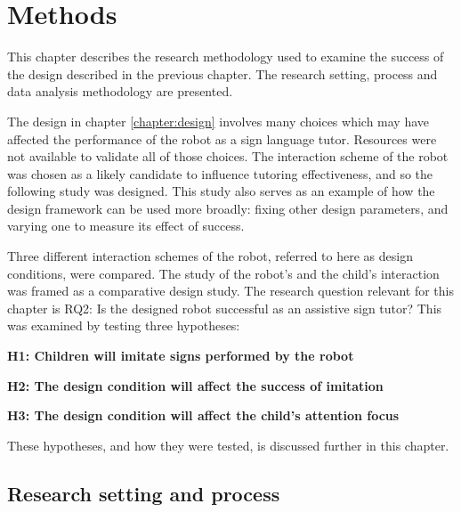 \chapter{Methods}
\label{chapter:methods}

This chapter describes the research methodology used to examine the success of the design described in the previous chapter. The research setting, process and data analysis methodology are presented. 

The design in chapter \ref{chapter:design} involves many choices which may have affected the performance of the robot as a sign language tutor. Resources were not available to validate all of those choices. The interaction scheme of the robot was chosen as a likely candidate to influence tutoring effectiveness, and so the following study was designed. This study also serves as an example of how the design framework can be used more broadly: fixing other design parameters, and varying one to measure its effect of success.

Three different interaction schemes of the robot, referred to here as design conditions, were compared. The study of the robot's and the child's interaction was framed as a comparative design study. The research question relevant for this chapter is RQ2: Is the designed robot successful as an assistive sign tutor? This was examined by testing three hypotheses: 


\vspace{3mm}

\noindent\textbf{H1: Children will imitate signs performed by the robot}
\vspace{3mm}

\noindent\textbf{H2: The design condition will affect the success of imitation}
\vspace{3mm}

\noindent\textbf{H3: The design condition will affect the child's attention focus}
\vspace{3mm}

These hypotheses, and how they were tested, is discussed further in this chapter.


\section{Research setting and process}

